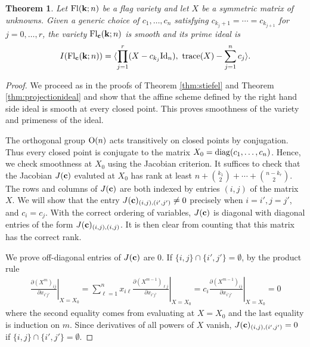 \documentclass[12pt]{extarticle}
\newtheorem{theorem}{Theorem}
\theoremstyle{definition}
\numberwithin{theorem}{section}
\begin{document}
\begin{theorem}\label{thm:iso_ideal}
    Let ${\rm Fl}({\bf k};n)$ be a flag variety and let $X$ be a symmetric matrix of unknowns. 
    Given a generic choice of $c_1, \ldots, c_n$ satisfying $c_{k_j+1} = \cdots =c_{k_{j+1}}$ for $j=0, \ldots, r$, the variety ${\rm Fl}_{\bf c}({\bf k}; n)$ is smooth and its prime ideal is
    \begin{align*}
        I({\rm Fl}_{\bf c}({\bf k};n)) = 
        \langle \prod_{j = 1}^r (X - c_{k_j}{\rm Id}_n), \,\,
        {\rm trace}(X) - \sum_{j = 1}^n c_j \rangle.
    \end{align*}
\end{theorem}
\begin{proof}
    We proceed as in the proofs of Theorem \ref{thm:stiefel} and Theorem \ref{thm:projectionideal} and show that the affine scheme defined by the right hand side ideal is smooth at every closed point. This proves smoothness of the variety and primeness of the ideal. 
    
    The orthogonal group ${\rm O}(n)$ acts transitively on closed points by conjugation. 
    Thus every closed point is conjugate to the matrix $X_0 = {\rm diag}(c_1, \ldots, c_n)$.
    Hence, we check smoothness at $X_0$ using the Jacobian criterion. 
    It suffices to check that the Jacobian $J({\bf c})$ evaluted at $X_0$
    has rank at least $n + \binom{k_1}{2} + \cdots + \binom{n-k_r}{2}$. 
    The rows and columns of $J({\bf c})$ are both indexed by entries $(i,j)$ of the matrix $X$. 
    We will show that the entry $J({\bf c})_{(i,j), (i', j')} \neq 0$ precisely when $i = i', j = j'$, and $c_i = c_j$.
    With the correct ordering of variables, $J({\bf c})$ is diagonal with diagonal entries of the form $J({\bf c})_{(i,j), (i,j)}$.
    It is then clear from counting that this matrix has the correct rank. 

    We prove off-diagonal entries of $J({\bf c})$ are $0$. 
    If $\{i,j\} \cap \{i',j'\} = \emptyset$, by the product rule 
    \begin{align*}
       \left. \frac{\partial(X^m)_{ij}}{\partial x_{i'j'}}  \right|_{X = X_0} = 
       \left. \sum_{\ell=1}^n x_{i\ell} \frac{\partial (X^{m-1})_{\ell j}}{\partial x_{i'j'}} \right |_{X = X_0}
       =
       \left. c_i \frac{\partial (X^{m-1})_{i j}}{\partial x_{i'j'}} \right |_{X = X_0} = 0
    \end{align*}
    where the second equality comes from evaluating at $X = X_0$ and the last equality is induction on $m$.
    Since derivatives of all powers of $X$ vanish,  $J({\bf c})_{(i,j), (i',j')} = 0$ if $\{i,j\} \cap \{i',j'\} = \emptyset$.


\end{proof}
\end{document}
